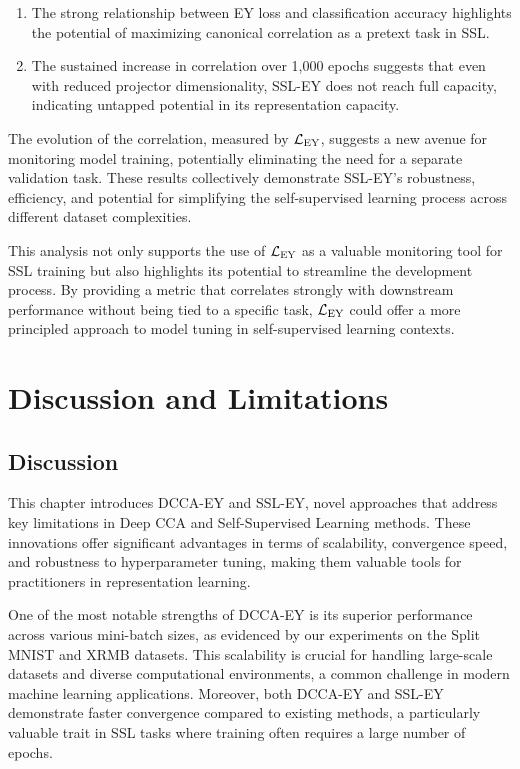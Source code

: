 \begin{enumerate}
    \item The strong relationship between EY loss and classification accuracy highlights the potential of maximizing canonical correlation as a pretext task in SSL.
    \item The sustained increase in correlation over 1,000 epochs suggests that even with reduced projector dimensionality, SSL-EY does not reach full capacity, indicating untapped potential in its representation capacity.
\end{enumerate}

The evolution of the correlation, measured by $\mathcal{L}_\text{EY}$, suggests a new avenue for monitoring model training, potentially eliminating the need for a separate validation task. These results collectively demonstrate SSL-EY's robustness, efficiency, and potential for simplifying the self-supervised learning process across different dataset complexities.

This analysis not only supports the use of $\mathcal{L}_\text{EY}$ as a valuable monitoring tool for SSL training but also highlights its potential to streamline the development process. By providing a metric that correlates strongly with downstream performance without being tied to a specific task, $\mathcal{L}_\text{EY}$ could offer a more principled approach to model tuning in self-supervised learning contexts.

\section{Discussion and Limitations}

\subsection{Discussion}

This chapter introduces DCCA-EY and SSL-EY, novel approaches that address key limitations in Deep CCA and Self-Supervised Learning methods. These innovations offer significant advantages in terms of scalability, convergence speed, and robustness to hyperparameter tuning, making them valuable tools for practitioners in representation learning.

One of the most notable strengths of DCCA-EY is its superior performance across various mini-batch sizes, as evidenced by our experiments on the Split MNIST and XRMB datasets. This scalability is crucial for handling large-scale datasets and diverse computational environments, a common challenge in modern machine learning applications. Moreover, both DCCA-EY and SSL-EY demonstrate faster convergence compared to existing methods, a particularly valuable trait in SSL tasks where training often requires a large number of epochs.


